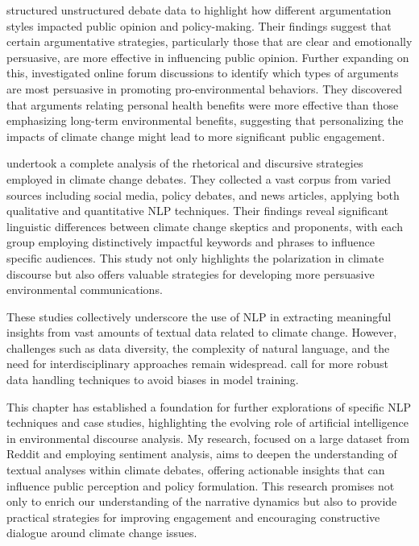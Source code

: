 \cite{foderaro2023argumentative} structured unstructured debate data to highlight how different argumentation styles impacted public opinion and policy-making. Their findings suggest that certain argumentative strategies, particularly those that are clear and emotionally persuasive, are more effective in influencing public opinion. Further expanding on this, \cite{CINDERBY2023100143} investigated online forum discussions to identify which types of arguments are most persuasive in promoting pro-environmental behaviors. They discovered that arguments relating personal health benefits were more effective than those emphasizing long-term environmental benefits, suggesting that personalizing the impacts of climate change might lead to more significant public engagement.

\cite{doe2021climate} undertook a complete analysis of the rhetorical and discursive strategies employed in climate change debates. They collected a vast corpus from varied sources including social media, policy debates, and news articles, applying both qualitative and quantitative NLP techniques. Their findings reveal significant linguistic differences between climate change skeptics and proponents, with each group employing distinctively impactful keywords and phrases to influence specific audiences. This study not only highlights the polarization in climate discourse but also offers valuable strategies for developing more persuasive environmental communications.

These studies collectively underscore the use of NLP in extracting meaningful insights from vast amounts of textual data related to climate change. However, challenges such as data diversity, the complexity of natural language, and the need for interdisciplinary approaches remain widespread. \cite{veritasnlp2024} call for more robust data handling techniques to avoid biases in model training.

This chapter has established a foundation for further explorations of specific NLP techniques and case studies, highlighting the evolving role of artificial intelligence in environmental discourse analysis. My research, focused on a large dataset from Reddit and employing sentiment analysis, aims to deepen the understanding of textual analyses within climate debates, offering actionable insights that can influence public perception and policy formulation. This research promises not only to enrich our understanding of the narrative dynamics but also to provide practical strategies for improving engagement and encouraging constructive dialogue around climate change issues.